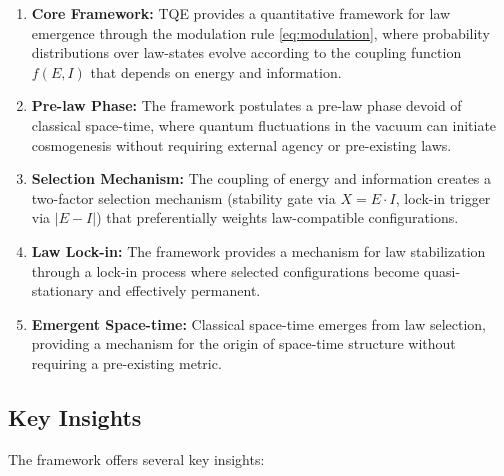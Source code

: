 \documentclass[12pt,a4paper]{article}
\theoremstyle{definition}
\theoremstyle{remark}
\begin{document}
\begin{enumerate}
\item \textbf{Core Framework:} TQE provides a quantitative framework for law emergence through the modulation rule \eqref{eq:modulation}, where probability distributions over law-states evolve according to the coupling function $f(E,I)$ that depends on energy and information.

\item \textbf{Pre-law Phase:} The framework postulates a pre-law phase devoid of classical space-time, where quantum fluctuations in the vacuum can initiate cosmogenesis without requiring external agency or pre-existing laws.

\item \textbf{Selection Mechanism:} The coupling of energy and information creates a two-factor selection mechanism (stability gate via $X = E \cdot I$, lock-in trigger via $|E - I|$) that preferentially weights law-compatible configurations.

\item \textbf{Law Lock-in:} The framework provides a mechanism for law stabilization through a lock-in process where selected configurations become quasi-stationary and effectively permanent.

\item \textbf{Emergent Space-time:} Classical space-time emerges from law selection, providing a mechanism for the origin of space-time structure without requiring a pre-existing metric.
\end{enumerate}

\subsection{Key Insights}

The framework offers several key insights:
\end{document}
